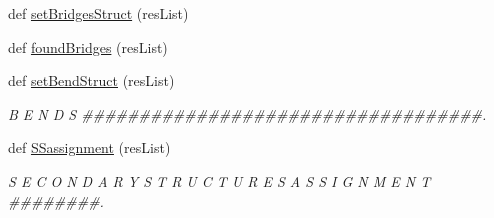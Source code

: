 \begin{DoxyCompactItemize}
\item 
def \hyperlink{namespacestructures_a1a156b836f27d7708a3e65951ffc9567}{set\+Bridges\+Struct} (res\+List)
\item 
def \hyperlink{namespacestructures_a632bc453c2c7b8140249c8a91e03c06b}{found\+Bridges} (res\+List)
\item 
def \hyperlink{namespacestructures_a6588a3b5c9f8ea0f2937bd1a08342a5b}{set\+Bend\+Struct} (res\+List)
\begin{DoxyCompactList}\small\item\em B E N D S \#\#\#\#\#\#\#\#\#\#\#\#\#\#\#\#\#\#\#\#\#\#\#\#\#\#\#\#\#\#\#\#\#\#\#. \end{DoxyCompactList}\item 
def \hyperlink{namespacestructures_a6bab85ee160c457a0b2f01456b617326}{S\+Sassignment} (res\+List)
\begin{DoxyCompactList}\small\item\em S E C O N D A R Y S T R U C T U R E S A S S I G N M E N T \#\#\#\#\#\#\#\#. \end{DoxyCompactList}\end{DoxyCompactItemize}
